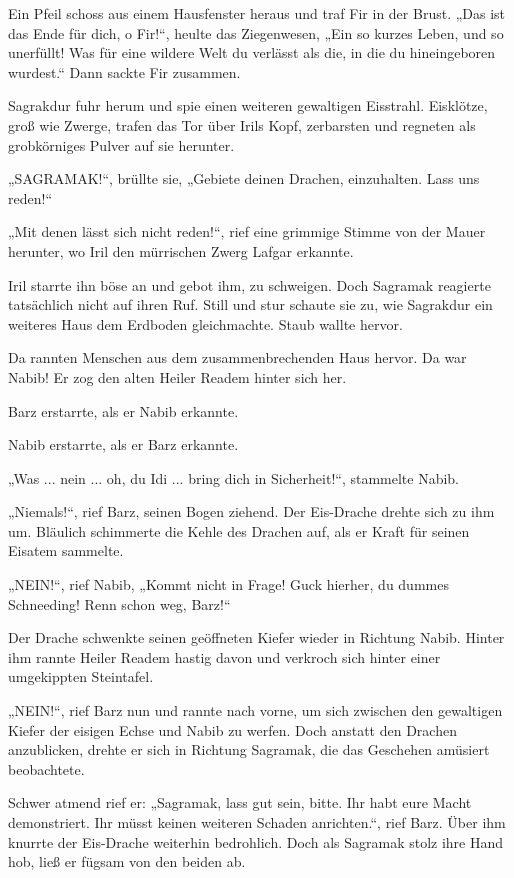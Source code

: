 Ein Pfeil schoss aus einem Hausfenster heraus und traf Fir in der Brust. „Das ist das Ende für dich, o Fir!“, heulte das Ziegenwesen, „Ein so kurzes Leben, und so unerfüllt! Was für eine wildere Welt du verlässt als die, in die du hineingeboren wurdest.“ Dann sackte Fir zusammen.

Sagrakdur fuhr herum und spie einen weiteren gewaltigen Eisstrahl. Eisklötze, groß wie Zwerge, trafen das Tor über Irils Kopf, zerbarsten und regneten als grobkörniges Pulver auf sie herunter.

„SAGRAMAK!“, brüllte sie, „Gebiete deinen Drachen, einzuhalten. Lass uns reden!“

„Mit denen lässt sich nicht reden!“, rief eine grimmige Stimme von der Mauer herunter, wo Iril den mürrischen Zwerg Lafgar erkannte.

Iril starrte ihn böse an und gebot ihm, zu schweigen. Doch Sagramak reagierte tatsächlich nicht auf ihren Ruf. Still und stur schaute sie zu, wie Sagrakdur ein weiteres Haus dem Erdboden gleichmachte. Staub wallte hervor.

Da rannten Menschen aus dem zusammenbrechenden Haus hervor. Da war Nabib! Er zog den alten Heiler Readem hinter sich her.

Barz erstarrte, als er Nabib erkannte.

Nabib erstarrte, als er Barz erkannte.

„Was ... nein ... oh, du Idi ... bring dich in Sicherheit!“, stammelte Nabib.

„Niemals!“, rief Barz, seinen Bogen ziehend. Der Eis-Drache drehte sich zu ihm um. Bläulich schimmerte die Kehle des Drachen auf, als er Kraft für seinen Eisatem sammelte.

„NEIN!“, rief Nabib, „Kommt nicht in Frage! Guck hierher, du dummes Schneeding! Renn schon weg, Barz!“

Der Drache schwenkte seinen geöffneten Kiefer wieder in Richtung Nabib. Hinter ihm rannte Heiler Readem hastig davon und verkroch sich hinter einer umgekippten Steintafel.

„NEIN!“, rief Barz nun und rannte nach vorne, um sich zwischen den gewaltigen Kiefer der eisigen Echse und Nabib zu werfen. Doch anstatt den Drachen anzublicken, drehte er sich in Richtung Sagramak, die das Geschehen amüsiert beobachtete.

Schwer atmend rief er: „Sagramak, lass gut sein, bitte. Ihr habt eure Macht demonstriert. Ihr müsst keinen weiteren Schaden anrichten.“, rief Barz. Über ihm knurrte der Eis-Drache weiterhin bedrohlich. Doch als Sagramak stolz ihre Hand hob, ließ er fügsam von den beiden ab.

